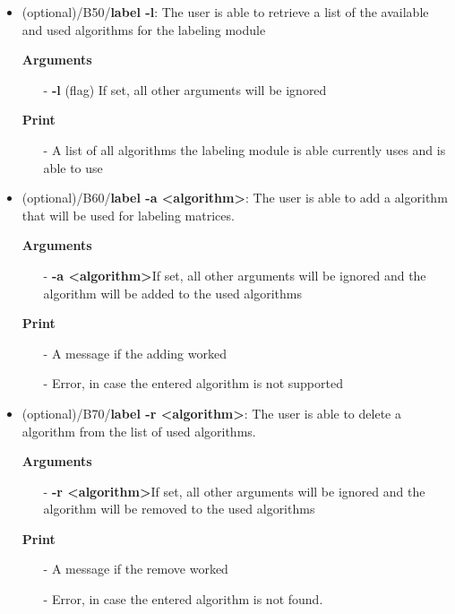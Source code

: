 \documentclass[parskip=full]{scrartcl}
\begin{document}
\begin{itemize}
\textbf{Arguments}
	\begin{itemize}
	\item[-]\textbf{-l} (flag) If set, all other arguments will be ignored 
	\end{itemize}
\textbf{Print}
	\begin{itemize}
	\item[-]A list of all \glspl{algorithm} the \gls{labeling module} is able currently uses and is able to use
	\end{itemize}

\item(optional)/B50/\textbf{label -l}:
\newline The user is able to retrieve a list of the available and used algorithms for the labeling module

\textbf{Arguments}
	\begin{itemize}
	\item[-]\textbf{-l} (flag) If set, all other arguments will be ignored 
	\end{itemize}
\textbf{Print}
	\begin{itemize}
	\item[-]A list of all \glspl{algorithm} the \gls{labeling module} is able currently uses and is able to use
	\end{itemize}

\item(optional)/B60/\textbf{label -a <algorithm>}:
\newline The user is able to add a \gls{algorithm} that will be used for labeling matrices.

\textbf{Arguments}
	\begin{itemize}
	\item[-]\textbf{-a <algorithm>}If set, all other arguments will be ignored and the \gls{algorithm} will be added to the used algorithms
	\end{itemize}
\textbf{Print}
	\begin{itemize}
	\item[-]A message if the adding worked
	\item[-]Error, in case the entered \gls{algorithm} is not supported 
	\end{itemize}

\item(optional)/B70/\textbf{label -r <algorithm>}:
\newline The user is able to delete a \gls{algorithm} from the list of used algorithms.

\textbf{Arguments}
	\begin{itemize}
	\item[-]\textbf{-r <algorithm>}If set, all other arguments will be ignored and the \gls{algorithm} will be removed to the used algorithms
	\end{itemize}
\textbf{Print}
	\begin{itemize}
	\item[-]A message if the remove worked
	\item[-]Error, in case the entered \gls{algorithm} is not found. 
	\end{itemize}

\end{itemize}
\clearpage
\end{document}
